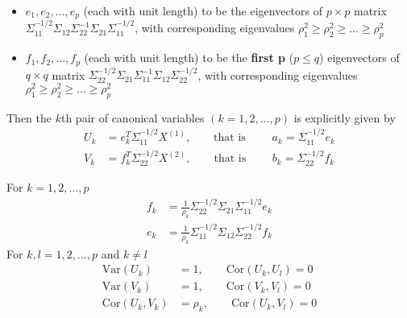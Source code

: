 \documentclass[12pt]{extarticle}
\newcommand{\<}{\langle}
\renewcommand{\>}{\rangle}
\theoremstyle{definition}
\begin{document}
\begin{tcolorbox}[enhanced, drop fuzzy shadow, title=Result 10.1]
\begin{itemize}
    \item $e_1, e_2, ...,e_p$ (each with unit length) to be the eigenvectors of $p \times p$ matrix $\Sigma_{11}^{-1/2}\Sigma_{12}\Sigma_{22}^{-1}\Sigma_{21}\Sigma_{11}^{-1/2}$, with corresponding eigenvalues $\rho_1^2 \geq \rho_2^2 \geq \dots \geq \rho_p^2$
    \item $f_1, f_2, ...,f_p$ (each with unit length) to be the \textbf{first p} ($p \leq q$) eigenvectors of $q \times q$ matrix $\Sigma_{22}^{-1/2}\Sigma_{21}\Sigma_{11}^{-1}\Sigma_{12}\Sigma_{22}^{-1/2}$, with corresponding eigenvalues $\rho_1^2 \geq \rho_2^2 \geq \dots \geq \rho_p^2$
\end{itemize}
Then the $k$th pair of canonical variables $(k=1,2,...,p)$ is explicitly given by
\begin{align*}
    U_k &= e_k^T \Sigma_{11}^{-1/2} X^{(1)}, \qquad \text{that is } \qquad a_k = \Sigma_{11}^{-1/2}e_k\\
    V_k &= f_k^T \Sigma_{22}^{-1/2} X^{(2)}, \qquad \text{that is } \qquad b_k = \Sigma_{22}^{-1/2}f_k
\end{align*}
\end{tcolorbox}

For $k=1,2,...,p$
\begin{align*}
    f_k &= \frac{1}{\rho_k}\Sigma_{22}^{-1/2}\Sigma_{21}\Sigma_{11}^{-1/2} e_k\\
    e_k &= \frac{1}{\rho_k}\Sigma_{11}^{-1/2}\Sigma_{12}\Sigma_{22}^{-1/2} f_k
\end{align*}
For $k,l=1,2,...,p$ and $k\neq l$
\begin{align*}
    \text{Var}(U_k) &= 1, \qquad \text{Cor}(U_k,U_l)=0\\
    \text{Var}(V_k) &= 1, \qquad \text{Cor}(V_k,V_l)=0\\
    \text{Cor}(U_k,V_k) &= \rho_k, \qquad \text{Cor}(U_k,V_l) =0
\end{align*}
\end{document}

